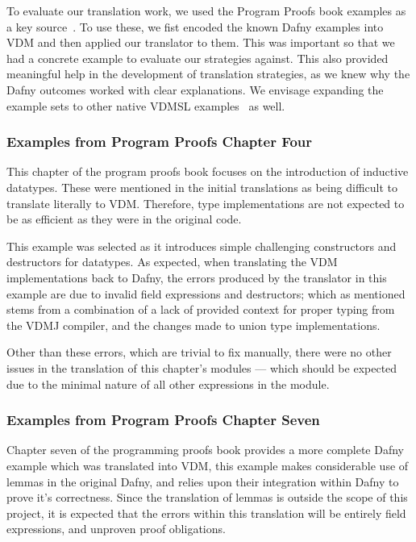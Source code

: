 \documentclass{entcs}
\begin{document}
To evaluate our translation work, we used the Program Proofs book examples as a key source~\cite{ProgProofsCodeExamples}. To use these, we fist encoded the known Dafny examples into VDM and then applied our translator to them. This was important so that we had a concrete example to evaluate our strategies against. This also provided meaningful help in the development of translation strategies, as we knew why the Dafny outcomes worked with clear explanations. We envisage expanding the example sets to other native VDMSL examples~\cite{VDMSLOvertureVDMExamplesPage} as well.

\subsubsection{Examples from Program Proofs Chapter Four}

This chapter of the program proofs book focuses on the introduction of inductive datatypes. These were mentioned in the initial translations as being difficult to translate literally to VDM. Therefore, type implementations are not expected to be as efficient as they were in the original code. 

This example was selected as it introduces simple challenging constructors and destructors for datatypes. As expected, when translating the VDM implementations back to Dafny, the errors produced by the translator in this example are due to invalid field expressions and destructors; which as mentioned stems from a combination of a lack of provided context for proper typing from the VDMJ compiler, and the changes made to union type implementations.

Other than these errors, which are trivial to fix manually, there were no other issues in the translation of this chapter's modules --- which should be expected due to the minimal nature of all other expressions in the module.

\subsubsection{Examples from Program Proofs Chapter Seven}

Chapter seven of the programming proofs book provides a more complete Dafny example which was translated into VDM, this example makes considerable use of lemmas in the original Dafny, and relies upon their integration within Dafny to prove it's correctness. Since the translation of lemmas is outside the scope of this project, it is expected that the errors within this translation will be entirely field expressions, and unproven proof obligations.
\end{document}
